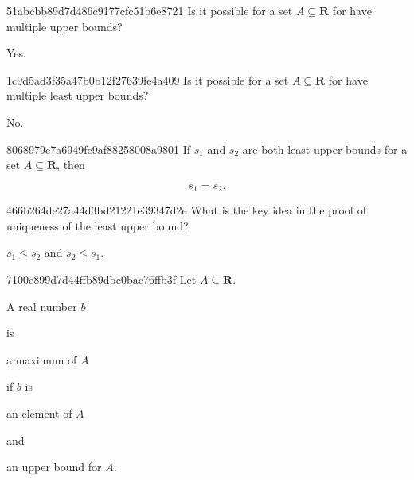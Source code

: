 \begin{note}{51abcbb89d7d486c9177cfc51b6e8721}
    Is it possible for a set \({ A \subseteq \mathbf{R} }\) for have multiple upper bounds?

    \begin{cloze}{1}
        Yes.
    \end{cloze}
\end{note}

\begin{note}{1c9d5ad3f35a47b0b12f27639fe4a409}
    Is it possible for a set \({ A \subseteq \mathbf{R} }\) for have multiple least upper bounds?

    \begin{cloze}{1}
        No.
    \end{cloze}
\end{note}

\begin{note}{8068979c7a6949fc9af88258008a9801}
    If \({ s_1 }\) and \({ s_2 }\) are both least upper bounds for a set \({ A \subseteq \mathbf{R} }\), then
    \begin{icloze}{1}
        \[
            s_1 = s_2.
        \]
    \end{icloze}
\end{note}

\begin{note}{466b264de27a44d3bd21221e39347d2e}
    What is the key idea in the proof of uniqueness of the least upper bound?

    \begin{cloze}{1}
        \({ s_1 \leqslant s_2 }\) and \({ s_2 \leqslant s_1 }\).
    \end{cloze}
\end{note}

\begin{note}{7100e899d7d44ffb89dbc0bac76ffb3f}
    Let \({ A \subseteq \mathbf{R} }\). \begin{icloze}{4}A real number \({ b }\)\end{icloze} is \begin{icloze}{3}a maximum of \({ A }\)\end{icloze} if \({ b }\) is \begin{icloze}{2}an element of \({ A }\)\end{icloze} and \begin{icloze}{1}an upper bound for \({ A }\).\end{icloze}
\end{note}

